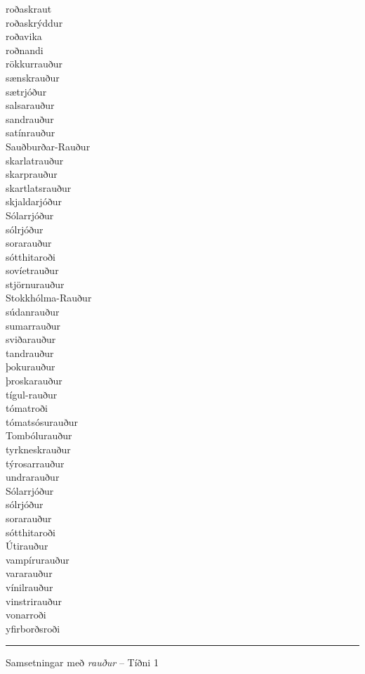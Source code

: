 \documentclass[../samsetningasafn.tex]{subfiles}
\begin{document}
\begin{bigwordlist}
\begin{footnotesize}
\begin{multicols}{4}
\begin{description}
		\item [roðaskraut]
		\item [roðaskrýddur]
		\item [roðavika]
		\item [roðnandi]
		\item [rökkurrauður]
		\item [sænskrauður]
		\item [sætrjóður]
		\item [salsarauður]
		\item [sandrauður]
		\item [satínrauður]
		\item [Sauðburðar-Rauður]
		\item [skarlatrauður]
		\item [skarprauður]
		\item [skartlatsrauður]
		\item [skjaldarjóður]
		\item [Sólarrjóður]
		\item [sólrjóður]
		\item [sorarauður]
		\item [sótthitaroði]
		\item [sovíetrauður]
		\item [stjörnurauður]
		\item [Stokkhólma-Rauður]
		\item [súdanrauður]
		\item [sumarrauður]
		\item [sviðarauður]
		\item [tandrauður]
		\item [þokurauður]
		\item [þroskarauður]
		\item [tígul-rauður]
		\item [tómatroði]
		\item [tómatsósurauður]
		\item [Tombólurauður]
		\item [tyrkneskrauður]
		\item [týrosarrauður]
		\item [undrarauður]
		\item [Sólarrjóður]
		\item [sólrjóður]
		\item [sorarauður]
		\item [sótthitaroði]
		\item [Útirauður]
		\item [vampírurauður]
		\item [vararauður]
		\item [vínilrauður]
		\item [vinstrirauður]
		\item [vonarroði]
		\item [yfirborðsroði]
	\end{description}
\end{multicols}
	\hrule
\end{footnotesize}

\label{listi:raud1}
\caption{Samsetningar með \textit{rauður} -- Tíðni 1}
\end{bigwordlist}
\end{document}
